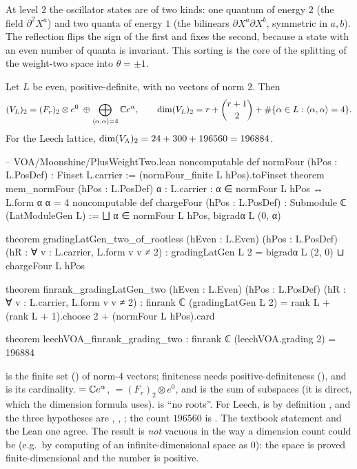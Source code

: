 \begin{physics}
At level $2$ the oscillator states are of two kinds: one quantum of energy $2$ (the field $\partial^2X^a$) and two quanta of energy $1$ (the bilinears $\partial X^a\partial X^b$, symmetric in $a,b$). The reflection flips the sign of the first and fixes the second, because a state with an even number of quanta is invariant. This sorting is the core of the splitting of the weight-two space into $\theta=\pm1$.
\end{physics}

\begin{theorem}\label{ch04:thm:wt2rootless}
Let $L$ be even, positive-definite, with no vectors of norm $2$. Then
\begin{equation*}
  (V_L)_2=(F_r)_2\otimes e^0\;\oplus\bigoplus_{\langle\alpha,\alpha\rangle=4}{\mathbb{C}} e^\alpha,
  \qquad
  \dim(V_L)_2=r+\binom{r+1}{2}+\#\{\alpha\in L:\langle\alpha,\alpha\rangle=4\}.
\end{equation*}
For the Leech lattice, $\dim(V_{\Lambda})_2=24+300+196560=196884$.
\end{theorem}

\begin{leancode}
-- VOA/Moonshine/PlusWeightTwo.lean
noncomputable def normFour (hPos : L.PosDef) : Finset L.carrier := (normFour_finite L hPos).toFinset
theorem mem_normFour (hPos : L.PosDef) {α : L.carrier} : α ∈ normFour L hPos ↔ L.form α α = 4
noncomputable def chargeFour (hPos : L.PosDef) : Submodule ℂ (LatModuleGen L) :=
  ⨆ α ∈ normFour L hPos, bigradα L (0, α)

theorem gradingLatGen_two_of_rootless (hEven : L.Even) (hPos : L.PosDef)
    (hR : ∀ v : L.carrier, L.form v v ≠ 2) :
    gradingLatGen L 2 = bigradα L (2, 0) ⊔ chargeFour L hPos

theorem finrank_gradingLatGen_two (hEven : L.Even) (hPos : L.PosDef)
    (hR : ∀ v : L.carrier, L.form v v ≠ 2) :
    finrank ℂ (gradingLatGen L 2)
      = rank L + (rank L + 1).choose 2 + (normFour L hPos).card

theorem leechVOA_finrank_grading_two : finrank ℂ (leechVOA.grading 2) = 196884
\end{leancode}

\begin{dictionary}
 is the finite set () of norm-$4$ vectors; finiteness needs
positive-definiteness (), and  is its cardinality.
 $={\mathbb{C}} e^\alpha$,  $=(F_r)_2\otimes e^0$, and  is
the sum of subspaces (it is direct, which the dimension formula uses).  is ``no roots''.
For Leech,  is by definition , and the three
hypotheses are , , ; the count $196560$ is
. The textbook statement and the Lean one agree. The result is
\emph{not} vacuous in the way a dimension count could be (e.g.\ by computing  of an
infinite-dimensional space as $0$): the space is proved finite-dimensional and the number is
positive.
\end{dictionary}

